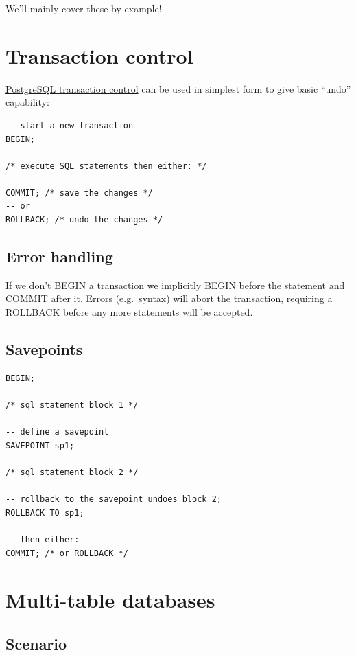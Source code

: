 \documentclass[slides]{pgnotes}
\begin{document}
We'll mainly cover these by example!


\section{Transaction control}
\label{sec:transaction-control}

\href{https://www.postgresql.org/docs/15/tutorial-transactions.html}{PostgreSQL
transaction control} can be used in simplest form to give basic ``undo''
capability:

\begin{verbatim}
-- start a new transaction
BEGIN;

/* execute SQL statements then either: */

COMMIT; /* save the changes */
-- or
ROLLBACK; /* undo the changes */
\end{verbatim}

\subsection{Error handling}
\label{sec:error-handling}

If we don't BEGIN a transaction we implicitly BEGIN before the statement
and COMMIT after it. Errors (e.g.~syntax) will abort the transaction,
requiring a ROLLBACK before any more statements will be accepted.

\subsection{Savepoints}\label{savepoints}

\begin{verbatim}
BEGIN;

/* sql statement block 1 */

-- define a savepoint
SAVEPOINT sp1;

/* sql statement block 2 */

-- rollback to the savepoint undoes block 2; 
ROLLBACK TO sp1;

-- then either:
COMMIT; /* or ROLLBACK */
\end{verbatim}





\section{Multi-table databases}

\subsection{Scenario}
\end{document}

